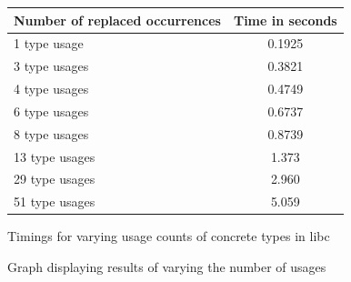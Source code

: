 
\begin{figure}[H]
\begin{center}
    \begin{tabular}{ | l | c |}
    \hline
    \textbf{Number of replaced occurrences} & \textbf{Time in seconds} \\ \hline
    1 type usage &  0.1925  \\ \hline
    3 type usages &  0.3821  \\ \hline
    4 type usages &   0.4749  \\ \hline
    6 type usages &   0.6737  \\ \hline
    8 type usages &   0.8739 \\ \hline
    13 type usages  &  1.373 \\ \hline
    29 type usages &  2.960  \\ \hline
    51 type usages &  5.059 \\ \hline
    \end{tabular}
\end{center}

\caption{Timings for varying usage counts of concrete types in libc}
\label{Fig:scaling}
\end{figure}

\begin{figure}[H]
\begin{center}
\caption{Graph displaying results of varying the number of usages}
\label{Fig:comparerefs}
\end{center}
\end{figure}

